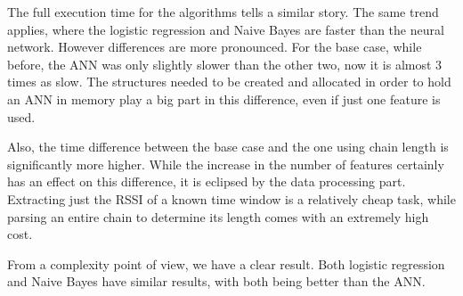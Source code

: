 The full execution time for the algorithms tells a similar story. The same trend applies, where the logistic regression and Naive Bayes are faster than the neural network. However differences are more pronounced. For the base case, while before, the ANN was only slightly slower than the other two, now it is almost 3 times as slow. The structures needed to be created and allocated in order to hold an ANN in memory play a big part in this difference, even if just one feature is used. 

Also, the time difference between the base case and the one using chain length is significantly more higher. While the increase in the number of features certainly has an effect on this difference, it is eclipsed by the data processing part. Extracting just the RSSI of a known time window is a relatively cheap task, while parsing an entire chain to determine its length comes with an extremely high cost. 

From a complexity point of view, we have a clear result. Both logistic regression and Naive Bayes have similar results, with both being better than the ANN. 
   